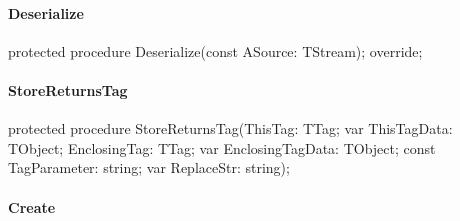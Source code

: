 \documentclass{report}
\newif\ifpdf
\begin{document}
\paragraph*{Deserialize}\hspace*{\fill}

\label{PasDoc_Items.TPasRoutine-Deserialize}
\begin{list}{}{
\setlength{\itemindent}{0cm}
\setlength{\listparindent}{0cm}
\setlength{\leftmargin}{\evensidemargin}
\addtolength{\leftmargin}{\tmplength}
\settowidth{\labelsep}{X}
\addtolength{\leftmargin}{\labelsep}
\setlength{\labelwidth}{\tmplength}
}
\item[\textbf{Declaration}\hfill]
\ifpdf
\begin{flushleft}
\fi
\begin{ttfamily}
protected procedure Deserialize(const ASource: TStream); override;\end{ttfamily}

\ifpdf
\end{flushleft}
\fi

\end{list}
\paragraph*{StoreReturnsTag}\hspace*{\fill}

\label{PasDoc_Items.TPasRoutine-StoreReturnsTag}
\begin{list}{}{
\setlength{\itemindent}{0cm}
\setlength{\listparindent}{0cm}
\setlength{\leftmargin}{\evensidemargin}
\addtolength{\leftmargin}{\tmplength}
\settowidth{\labelsep}{X}
\addtolength{\leftmargin}{\labelsep}
\setlength{\labelwidth}{\tmplength}
}
\item[\textbf{Declaration}\hfill]
\ifpdf
\begin{flushleft}
\fi
\begin{ttfamily}
protected procedure StoreReturnsTag(ThisTag: TTag; var ThisTagData: TObject; EnclosingTag: TTag; var EnclosingTagData: TObject; const TagParameter: string; var ReplaceStr: string);\end{ttfamily}

\ifpdf
\end{flushleft}
\fi

\end{list}
\paragraph*{Create}\hspace*{\fill}
\end{document}
